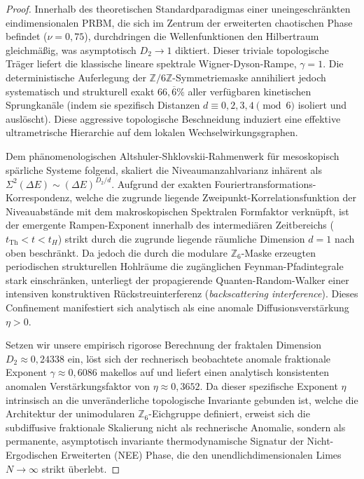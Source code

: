 \documentclass[aps,prl,preprint,superscriptaddress,floatfix]{revtex4-2}
\newcommand{\Z}{\mathbb{Z}}
\newcommand{\Zmod}{\mathbb{Z}/6\mathbb{Z}}
\begin{document}
\begin{proof}
Innerhalb des theoretischen Standardparadigmas einer uneingeschränkten eindimensionalen PRBM, die sich im Zentrum der erweiterten chaotischen Phase befindet ($\nu=0,75$), durchdringen die Wellenfunktionen den Hilbertraum gleichmäßig, was asymptotisch $D_2 \to 1$ diktiert. Dieser triviale topologische Träger liefert die klassische lineare spektrale Wigner-Dyson-Rampe, $\gamma = 1$. Die deterministische Auferlegung der $\Zmod$-Symmetriemaske annihiliert jedoch systematisch und strukturell exakt $66,\overline{6}\%$ aller verfügbaren kinetischen Sprungkanäle (indem sie spezifisch Distanzen $d \equiv 0, 2, 3, 4 \pmod 6$ isoliert und auslöscht). Diese aggressive topologische Beschneidung induziert eine effektive ultrametrische Hierarchie auf dem lokalen Wechselwirkungsgraphen. 

Dem phänomenologischen Altshuler-Shklovskii-Rahmenwerk für mesoskopisch spärliche Systeme folgend, skaliert die Niveaumanzahlvarianz inhärent als $\Sigma^2(\Delta E) \sim (\Delta E)^{D_2/d}$. Aufgrund der exakten Fouriertransformations-Korrespondenz, welche die zugrunde liegende Zweipunkt-Korrelationsfunktion der Niveauabstände mit dem makroskopischen Spektralen Formfaktor verknüpft, ist der emergente Rampen-Exponent innerhalb des intermediären Zeitbereichs ($t_{\text{Th}} < t < t_H$) strikt durch die zugrunde liegende räumliche Dimension $d=1$ nach oben beschränkt. Da jedoch die durch die modulare $\Z_6$-Maske erzeugten periodischen strukturellen Hohlräume die zugänglichen Feynman-Pfadintegrale stark einschränken, unterliegt der propagierende Quanten-Random-Walker einer intensiven konstruktiven Rückstreuinterferenz (\textit{backscattering interference}). Dieses Confinement manifestiert sich analytisch als eine anomale Diffusionsverstärkung $\eta > 0$. 

Setzen wir unsere empirisch rigorose Berechnung der fraktalen Dimension $D_2 \approx 0,24338$ ein, löst sich der rechnerisch beobachtete anomale fraktionale Exponent $\gamma \approx 0,6086$ makellos auf und liefert einen analytisch konsistenten anomalen Verstärkungsfaktor von $\eta \approx 0,3652$. Da dieser spezifische Exponent $\eta$ intrinsisch an die unveränderliche topologische Invariante gebunden ist, welche die Architektur der unimodularen $\Z_6$-Eichgruppe definiert, erweist sich die subdiffusive fraktionale Skalierung nicht als rechnerische Anomalie, sondern als permanente, asymptotisch invariante thermodynamische Signatur der Nicht-Ergodischen Erweiterten (NEE) Phase, die den unendlichdimensionalen Limes $N \to \infty$ strikt überlebt.
\end{proof}
\end{document}

